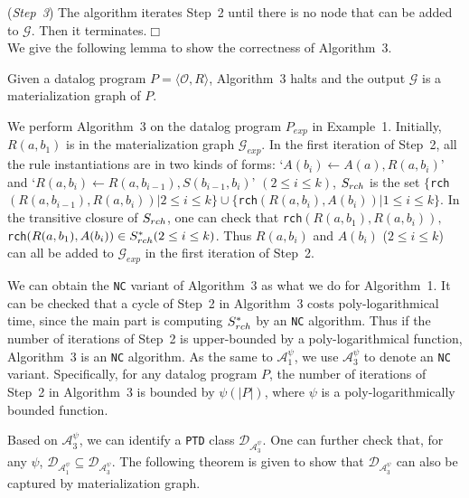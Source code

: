 \documentclass{article}
\begin{document}
(\emph{Step~3}) The algorithm iterates Step~2 until there is no node that can be added to $\mathcal{G}$. Then it terminates.\hfill$\Box$\\

We give the following lemma to show the correctness of Algorithm~3.

\begin{lemma}
Given a datalog program $P=\langle\mathcal{O}, R\rangle$, Algorithm~3 halts and the output $\mathcal{G}$ is a materialization graph of $P$.
\end{lemma}

\begin{example}
We perform Algorithm~3 on the datalog program $P_{exp}$ in Example~1. Initially, $R(a,b_1)$ is in the materialization graph $\mathcal{G}_{exp}$. In the first iteration of Step~2, all the rule instantiations are in two kinds of forms: `$A(b_{i})\leftarrow A(a),R(a,b_{i})$' and `$R(a,b_i)\leftarrow R(a,b_{i-1}),S(b_{i-1},b_i)$' $(2\leq i\leq k)$, $S_{\tiny rch}$ is the set $\{$\texttt{rch}$(R(a,b_{i-1}), R(a,b_i))|2\leq i\leq k\}\cup\{$\texttt{rch}$(R(a,b_i), A(b_i))|1\leq i\leq k\}$. In the transitive closure of $S_{\tiny rch}$,
one can check that \texttt{rch}$(R(a,b_1), R(a,b_i)),$\texttt{rch}$(R(a,b_1), A(b_i))\in S^*_{\tiny rch}(2\leq i\leq k)$. Thus $R(a,b_i)$ and $A(b_i)$ ($2\leq i\leq k$) can all be added to $\mathcal{G}_{exp}$ in the first iteration of Step~2.
\end{example}

We can obtain the \texttt{NC} variant of Algorithm~3 as what we do for Algorithm~1. It can be checked that a cycle
of Step~2 in Algorithm~3 costs poly-logarithmical time, since the main part is computing $S^*_{\tiny rch}$ by an \texttt{NC} algorithm. Thus if the number of iterations of Step~2 is upper-bounded by a poly-logarithmical function,
Algorithm~3 is an \texttt{NC} algorithm. As the same to $\mathcal{A}_1^{\psi}$, we use $\mathcal{A}_3^{\psi}$ to denote an \texttt{NC} variant. Specifically, for any datalog program $P$, the number of iterations of Step~2 in Algorithm~3 is
bounded by $\psi(|P|)$, where $\psi$ is a poly-logarithmically bounded function.

Based on $\mathcal{A}_3^{\psi}$, we can identify a \texttt{PTD} class $\mathcal{D}_{\mathcal{A}_3^{\psi}}$. One can further check that, for any $\psi$, $\mathcal{D}_{\mathcal{A}_1^{\psi}}\subseteq\mathcal{D}_{\mathcal{A}_3^{\psi}}$.
The following theorem is given to show that $\mathcal{D}_{\mathcal{A}_3^{\psi}}$ can also be captured by materialization graph.
\end{document}
